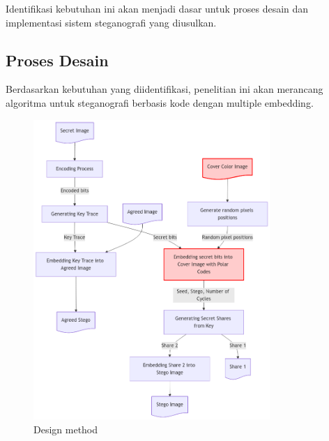 \documentclass{ittelkom}
\begin{document}
Identifikasi kebutuhan ini akan menjadi dasar untuk proses desain dan
implementasi sistem steganografi yang diusulkan.

\subsection{Proses Desain}
Berdasarkan kebutuhan yang diidentifikasi, penelitian ini akan merancang
algoritma untuk steganografi berbasis kode dengan multiple embedding.

\begin{figure}[h]
    \centering
    \includegraphics[width=0.8\textwidth]{gambar/proposed.png}
    \caption{Design method}
    \label{fig:flow}
\end{figure}

\end{document}
